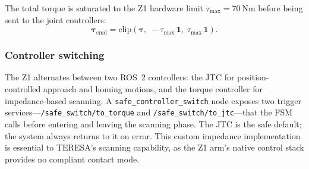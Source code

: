 The total torque is saturated to the Z1 hardware limit
$\tau_{\max} = \SI{70}{\newton\metre}$ before being sent to the joint
controllers:
\begin{equation}
  \boldsymbol{\tau}_{\mathrm{cmd}} =
  \mathrm{clip}\!\left(
    \boldsymbol{\tau},\;
    -\tau_{\max}\,\mathbf{1},\;
    \tau_{\max}\,\mathbf{1}
  \right).
  \label{eq:torque_clip}
\end{equation}

\subsubsection{Controller switching}
The Z1 alternates between two \ac{ROS}~2 controllers: the \ac{JTC} for
position-controlled approach and homing motions, and the torque controller
for impedance-based scanning. A \texttt{safe\_controller\_switch} node
exposes two trigger services---\texttt{/safe\_switch/to\_torque} and
\texttt{/safe\_switch/to\_jtc}---that the \ac{FSM} calls before entering
and leaving the scanning phase. The \ac{JTC} is the safe default; the
system always returns to it on error. This custom impedance implementation
is essential to \ac{TERESA}'s scanning capability, as the Z1 arm's native
control stack provides no compliant contact mode.
